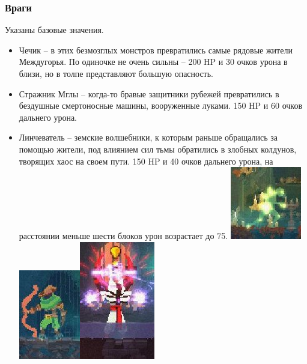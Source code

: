 \documentclass{article}
\begin{document}
\subsubsection{Враги}
Указаны базовые значения.
\begin{itemize}
\item Чечик – в этих безмозглых монстров превратились самые рядовые жители Междугорья. По одиночке не очень сильны – 200 HP и 30 очков урона в близи, но в толпе представляют большую опасность.
\item Стражник Мглы – когда-то бравые защитники рубежей превратились в бездушные смертоносные машины, вооруженные луками. 150 HP и 60 очков дальнего урона.
\item Линчеватель – земские волшебники, к которым раньше обращались за помощью жители, под влиянием сил тьмы обратились в злобных колдунов, творящих хаос на своем пути. 150 HP и 40 очков дальнего урона, на расстоянии меньше шести блоков урон возрастает до 75. 
\includegraphics[width=0.3\linewidth]{dd_chehcik.jpg}\hspace{0.5cm}\includegraphics[width=0.22\linewidth]{dd_luchnik.jpg}\hspace{0.5cm}\includegraphics[width=0.2\linewidth]{images/dd_mag.jpg}
\end{itemize}
\end{document}
